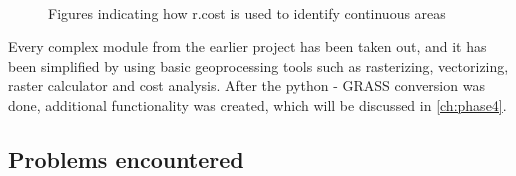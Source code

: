 \begin{figure}[h!]
  \myfloatalign
   \quad
   \\
 \caption{Figures indicating how r.cost is used to identify continuous areas}
 \label{fig:continuous}
\end{figure}

Every complex module from the earlier project has been taken out, and it has been simplified by using basic geoprocessing tools such as rasterizing, vectorizing, raster calculator and cost analysis. After the python - GRASS conversion was done, additional functionality was created, which will be discussed in \autoref{ch:phase4}.

\subsection{Problems encountered}

